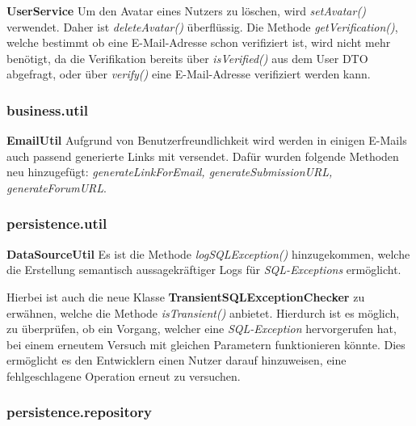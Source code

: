 \textbf{UserService} Um den Avatar eines Nutzers zu löschen, wird \emph{setAvatar()} verwendet. Daher ist \emph{deleteAvatar()} überflüssig. \newline
Die Methode \emph{getVerification()}, welche bestimmt ob eine E-Mail-Adresse schon verifiziert ist, wird nicht mehr benötigt, da die Verifikation bereits über \emph{isVerified()} aus dem User DTO abgefragt, oder über \emph{verify()} eine E-Mail-Adresse verifiziert werden kann.

\subsubsection{business.util}

\textbf{EmailUtil} Aufgrund von Benutzerfreundlichkeit wird
werden in einigen E-Mails auch passend generierte Links mit versendet. Dafür wurden folgende Methoden neu hinzugefügt: \emph{generateLinkForEmail, generateSubmissionURL, generateForumURL}.


\subsubsection{persistence.util}

\textbf{DataSourceUtil} Es ist die Methode \emph{logSQLException()} hinzugekommen, welche die Erstellung
semantisch aussagekräftiger Logs für \emph{SQL-Exceptions} ermöglicht.

Hierbei ist auch die neue Klasse \textbf{TransientSQLExceptionChecker} zu erwähnen, welche
die Methode \emph{isTransient()} anbietet.
Hierdurch ist es möglich, zu überprüfen, ob ein Vorgang,
welcher eine \emph{SQL-Exception} hervorgerufen hat, bei einem erneutem Versuch
mit gleichen Parametern funktionieren könnte.
Dies ermöglicht es den Entwicklern einen Nutzer darauf hinzuweisen,
eine fehlgeschlagene Operation erneut zu versuchen.

\subsubsection{persistence.repository}

